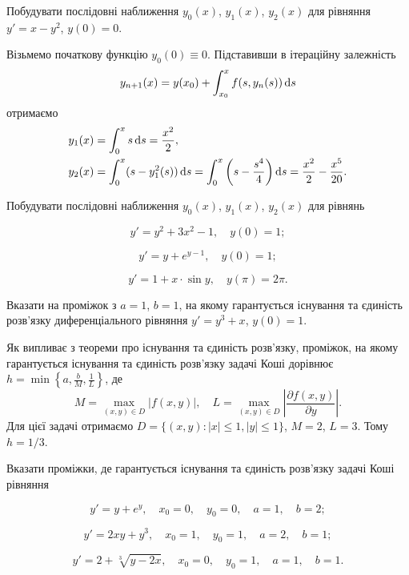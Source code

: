 \setcounter{problem}{0}

\begin{example}
	Побудувати послідовні наближення $y_0(x)$, $y_1(x)$, $y_2(x)$ для рівняння $y' = x - y^2$, $y(0) = 0$.
\end{example}
\begin{solution}
	Візьмемо початкову функцію $y_0(0) \equiv 0$. Підставивши в ітераційну залежність \[ y_{n+1} (x) = y(x_0) + \int_{x_0}^x f(s, y_n(s)) \mathop{}\!\mathrm{d} s \] отримаємо 
	\begin{align*} 
		y_1(x) &= \int_0^x s \mathop{}\!\mathrm{d} s = \frac{x^2}{2}, \\
		y_2(x) &= \int_0^x (s - y_1^2(s)) \mathop{}\!\mathrm{d} s = \int_0^x \left(s - \frac{s^4}{4}\right) \mathop{}\!\mathrm{d} s = \frac{x^2}{2} - \frac{x^5}{20}.
	\end{align*}
\end{solution}

Побудувати послідовні наближення $y_0(x)$, $y_1(x)$, $y_2(x)$ для рівнянь
\begin{problem}
	\[y' = y^2 + 3x^2 - 1, \quad y(0) = 1;\]
\end{problem}
\begin{problem}
	\[y'=y+e^{y-1},\quad y(0)=1;\]
\end{problem}
\begin{problem}
	\[y'=1+x\cdot\sin y, \quad y(\pi)=2\pi.\]
\end{problem}

\begin{example}
	Вказати на проміжок з $a=1$, $b=1$, на якому гарантується існування та єдиність розв’язку диференціального рівняння $y'=y^3+x$, $y(0)=1$.
\end{example}
\begin{solution}
	Як випливає з теореми про існування та єдиність розв’язку, проміжок, на якому гарантується існування та єдиність розв’язку задачі Коші дорівнює $h = \min \left\{ a, \frac{b}{M}, \frac{1}{L}\right\}$, де \[ M = \max_{(x,y)\in D} |f(x,y)|, \quad L = \max_{(x,y)\in D} \left|\frac{\partial f(x,y)}{\partial y}\right|.\] Для цієї задачі отримаємо $D = \{ (x,y): |x| \le 1, |y| \le 1\}$, $M=2$, $L=3$. Тому $h = 1/3$.
\end{solution}	

Вказати проміжки, де гарантується існування та єдиність розв’язку задачі Коші рівняння
\begin{problem}
	\[y'=y+e^y,\quad x_0=0, \quad y_0=0,\quad a=1,\quad b=2;\]
\end{problem}
\begin{problem}
	\[y'=2xy+y^3,\quad x_0=1, \quad y_0=1,\quad a=2,\quad b=1;\]
\end{problem}
\begin{problem}
	\[y'=2+\sqrt[3]{y-2x},\quad x_0=0, \quad y_0=1,\quad a=1,\quad b=1.\]
\end{problem}

